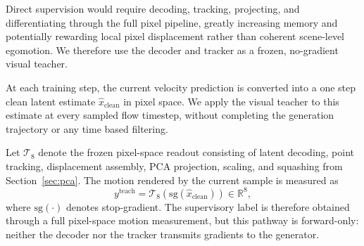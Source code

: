 \documentclass[letterpaper]{article} %
\begin{document}
Direct supervision would require decoding, tracking, projecting, and
differentiating through the full pixel pipeline, greatly increasing memory and
potentially rewarding local pixel displacement rather than coherent
scene-level egomotion. We therefore use the decoder and tracker as a frozen,
no-gradient visual teacher.

At each training step, the current velocity prediction is converted into a
one step clean latent estimate $\hat{x}_{\mathrm{clean}}$ in pixel space. We apply the visual teacher to this estimate at every sampled flow timestep, without
completing the generation trajectory or any time based filtering.

Let $\mathcal{T}_8$ denote the frozen pixel-space readout consisting of
latent decoding, point tracking, displacement assembly, PCA projection,
scaling, and squashing from Section~\ref{sec:pca}. The motion rendered by the
current sample is measured as
\begin{equation}
    y^{\mathrm{teach}}
    =
    \mathcal{T}_8
    \left(
        \mathrm{sg}(\hat{x}_{\mathrm{clean}})
    \right)
    \in\mathbb{R}^{8},
    \label{eq:teacher_readout}
\end{equation}
where $\mathrm{sg}(\cdot)$ denotes stop-gradient. The supervisory label is
therefore obtained through a full pixel-space motion measurement, but this
pathway is forward-only: neither the decoder nor the tracker transmits
gradients to the generator.
\end{document}

